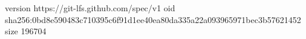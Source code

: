 version https://git-lfs.github.com/spec/v1
oid sha256:0bd8e590483c710395c6f91d1ee40ea80da335a22a093965971bec3b57621452
size 196704
